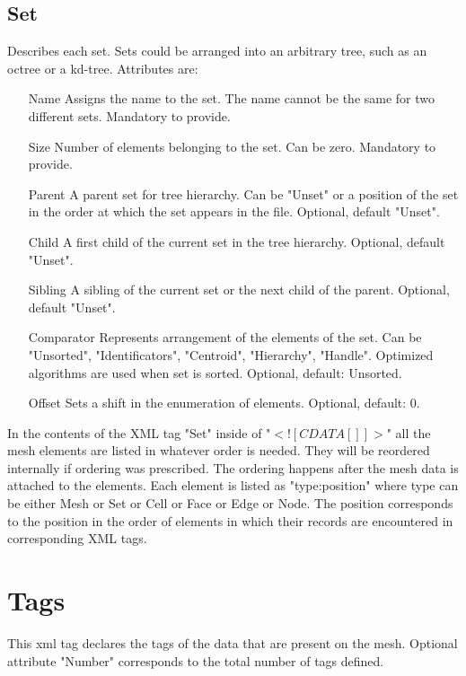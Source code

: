 \documentclass[14pt]{article}
\begin{document}
\subsection{Set}
Describes each set. Sets could be arranged into an arbitrary tree, such as an octree or a kd-tree. Attributes are:
\begin{itemize}
\item[Name] Assigns the name to the set. The name cannot be the same for two different sets. Mandatory to provide.
\item[Size] Number of elements belonging to the set. Can be zero. Mandatory to provide.
\item [Parent] A parent set for tree hierarchy. Can be "Unset" or a position of the set in the order at which the set appears in the file. Optional, default "Unset".
\item [Child] A first child of the current set in the tree hierarchy. Optional, default "Unset".
\item [Sibling] A sibling of the current set or the next child of the parent.  Optional, default "Unset".
\item [Comparator] Represents arrangement of the elements of the set. Can be "Unsorted", "Identificators", "Centroid", "Hierarchy", "Handle". Optimized algorithms are used when set is sorted. Optional, default: Unsorted.
\item [Offset] Sets a shift in the enumeration of elements. Optional, default: 0.
\end{itemize}
In the contents of the XML tag "Set" inside of  "$<![CDATA[]]>$" all the mesh elements are listed in whatever order is needed. They will be reordered internally if ordering was prescribed. The ordering happens after the mesh data is attached to the elements. Each element is listed as "type:position" where type can be either Mesh or Set or Cell or Face or Edge or Node. The position corresponds to the position in the order of elements in which their records are encountered in corresponding XML tags.
\section{Tags}
This xml tag declares the tags of the data that are present on the mesh. Optional attribute "Number" corresponds to the total number of tags defined.
\end{document}
